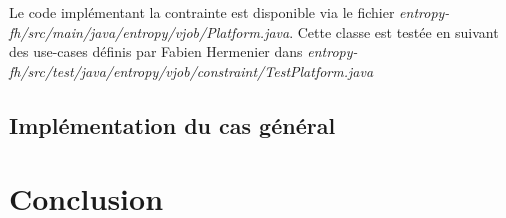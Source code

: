 \documentclass[a4paper]{article}
\begin{document}
Le code implémentant la contrainte est disponible via le fichier
\textit{entropy-fh/src/main/java/entropy/vjob/Platform.java}. Cette
classe est testée en suivant des use-cases définis par Fabien Hermenier dans
\textit{entropy-fh/src/test/java/entropy/vjob/constraint/TestPlatform.java}

\subsection{Implémentation du cas général}
\section{Conclusion}

\newpage
{}


\end{document}
